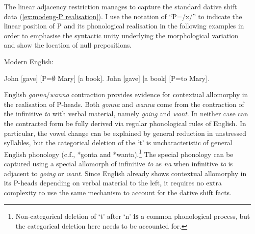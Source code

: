 	The linear adjacency restriction manages to capture the standard dative shift data (\ref{ex:modeng-P realisation}). I use the notation of ``P=/x/'' to indicate the linear position of P and its phonological realisation in the following examples in order to emphasise the syntactic unity underlying the morphological variation and show the location of null prepositions.
	\begin{exe}
		\ex Modern English:\label{ex:modeng-P realisation}
		\begin{xlist}
	\ex John [gave] [P=$\emptyset$ Mary] [a book].
	\ex John [gave] [a book] [P=to Mary].
\end{xlist}
	\end{exe}

	English \textit{gonna}/\textit{wanna} contraction provides evidence for contextual allomorphy in the realisation of P-heads. Both \textit{gonna} and \textit{wanna} come from the contraction of the infinitive \textit{to} with verbal material, namely \textit{going} and \textit{want}. In neither case can the contracted form be fully derived via regular phonological rules of English. In particular, the vowel change can be explained by general reduction in unstressed syllables, but the categorical deletion of the `t' is uncharacteristic of general English phonology (c.f., *gonta and *wanta).\footnote{Non-categorical deletion of `t' after `n' \textbf{is} a common phonological process, but the categorical deletion here needs to be accounted for.} The special phonology can be captured using a special allomorph of infinitive \textit{to} as \textit{na} when infinitive \textit{to} is adjacent to \textit{going} or \textit{want}. Since English already shows contextual allomorphy in its P-heads depending on verbal material to the left, it requires no extra complexity to use the same mechanism to account for the dative shift facts.

